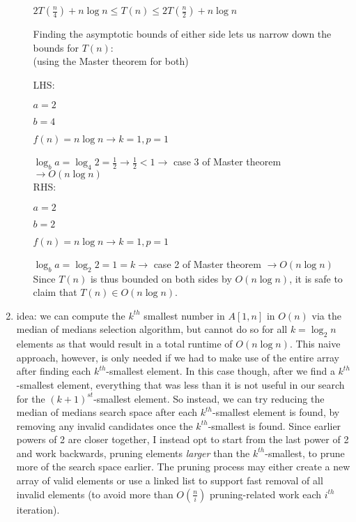 \documentclass[12pt]{article}
\begin{document}
\begin{enumerate}
\begin{enumerate}
        \centerline{$2T(\frac{n}{4}) + n\log n \leq T(n) \leq 2T(\frac{n}{2}) + n\log n$}

        Finding the asymptotic bounds of either side lets us narrow down the bounds for $T(n)$:\\

        (using the Master theorem for both)

        LHS:

        $a = 2$

        $b = 4$

        $f(n) = n\log n \longrightarrow k = 1, p = 1$

        $\log_{b}{a} = \log_{4}{2} = \frac{1}{2} \longrightarrow \frac{1}{2} < 1 \longrightarrow$ case 3 of Master theorem
        $\longrightarrow O(n\log n)$\\

        RHS:

        $a = 2$

        $b = 2$

        $f(n) = n\log n \longrightarrow k = 1, p = 1$

        $\log_{b}{a} = \log_{2}{2} = 1 = k \longrightarrow$ case 2 of Master theorem 
        $\longrightarrow O(n\log n)$\\

        Since $T(n)$ is thus bounded on both sides by $O(n\log n)$, it is safe to claim that $T(n) \in O(n\log n)$.

    \end{enumerate}
    \item idea: we can compute the $k^{th}$ smallest number in $A[1, n]$ in $O(n)$ via the median of medians selection 
    algorithm, but cannot do so for all $k = \log_2n$ elements as that would result in a total runtime of $O(n\log n)$. 
    This naive approach, however, is only needed if we had to make use of the entire array after finding each $k^{th}$-smallest 
    element. In this case though, after we find a $k^{th}$-smallest element, everything that was less than it is not useful 
    in our search for the $(k+1)^{st}$-smallest element. So instead, we can try reducing the median of medians search space 
    after each $k^{th}$-smallest element is found, by removing any invalid candidates once the $k^{th}$-smallest is found. 
    Since earlier powers of 2 are closer together, I instead opt to start from the last power of 2 and work backwards, pruning 
    elements \textit{larger} than the $k^{th}$-smallest, to prune more of the search space earlier. The pruning process 
    may either create a new array of valid elements or use a linked list to support fast removal of all invalid elements 
    (to avoid more than $O(\frac{n}{i})$ pruning-related work each $i^{th}$ iteration).


\end{enumerate}
\end{document}
